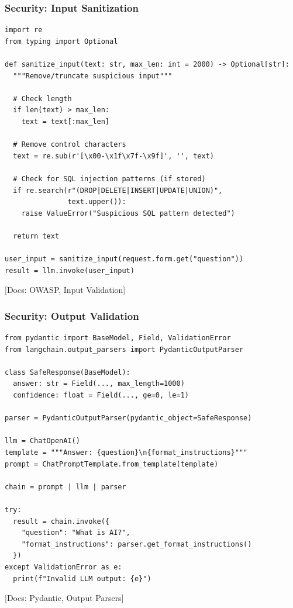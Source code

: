 \documentclass[aspectratio=169,11pt]{beamer}
\newcommand{\docref}[1]{{\scriptsize\color{docgray}[Docs: #1]}}
\begin{document}
\begin{frame}[fragile,shrink=8]
\frametitle{Security: Input Sanitization}

\begin{lstlisting}
import re
from typing import Optional

def sanitize_input(text: str, max_len: int = 2000) -> Optional[str]:
  """Remove/truncate suspicious input"""

  # Check length
  if len(text) > max_len:
    text = text[:max_len]

  # Remove control characters
  text = re.sub(r'[\x00-\x1f\x7f-\x9f]', '', text)

  # Check for SQL injection patterns (if stored)
  if re.search(r"(DROP|DELETE|INSERT|UPDATE|UNION)",
               text.upper()):
    raise ValueError("Suspicious SQL pattern detected")

  return text

user_input = sanitize_input(request.form.get("question"))
result = llm.invoke(user_input)
\end{lstlisting}

\docref{OWASP, Input Validation}

\end{frame}

\begin{frame}[fragile,shrink=5]
\frametitle{Security: Output Validation}
\vspace{-0.3cm}

\begin{lstlisting}
from pydantic import BaseModel, Field, ValidationError
from langchain.output_parsers import PydanticOutputParser

class SafeResponse(BaseModel):
  answer: str = Field(..., max_length=1000)
  confidence: float = Field(..., ge=0, le=1)

parser = PydanticOutputParser(pydantic_object=SafeResponse)

llm = ChatOpenAI()
template = """Answer: {question}\n{format_instructions}"""
prompt = ChatPromptTemplate.from_template(template)

chain = prompt | llm | parser

try:
  result = chain.invoke({
    "question": "What is AI?",
    "format_instructions": parser.get_format_instructions()
  })
except ValidationError as e:
  print(f"Invalid LLM output: {e}")
\end{lstlisting}

\docref{Pydantic, Output Parsers}

\end{frame}
\end{document}
